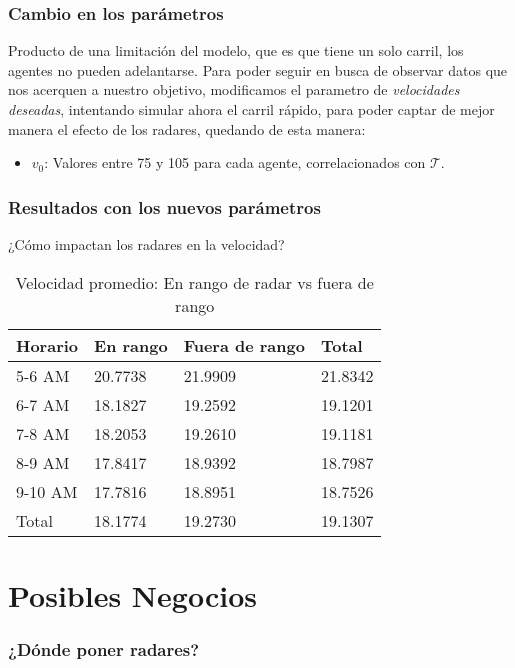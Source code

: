\documentclass[10pt, compress]{beamer}
\begin{document}
\begin{frame}
\frametitle{Cambio en los par\'ametros}

Producto de una limitaci\'on del modelo, que es que tiene un solo carril, los agentes no pueden adelantarse. Para poder seguir en busca de observar datos que nos acerquen a nuestro objetivo, modificamos el parametro de \textit{velocidades deseadas}, intentando simular ahora el carril r\'apido, para poder captar de mejor manera el efecto de los radares, quedando de esta manera:

\begin{itemize}
\item $v_0$: Valores entre 75 y 105 para cada agente, correlacionados con $\mathcal{T}$.
\end{itemize}

\end{frame}

\begin{frame}
\frametitle{Resultados con los nuevos par\'ametros}
\end{frame}

\begin{frame}{¿C\'omo impactan los radares en la velocidad?}
  \begin{table}
    \caption{Velocidad promedio: En rango de radar vs fuera de rango}
    \begin{tabular}{llll}
      \toprule
      Horario & En rango & Fuera de rango & Total \\
      \midrule
      5-6 AM & 20.7738 & 21.9909 & 21.8342\\
      6-7 AM & 18.1827 & 19.2592 & 19.1201\\
      7-8 AM & 18.2053 & 19.2610 & 19.1181\\
      8-9 AM & 17.8417 & 18.9392 & 18.7987\\
      9-10 AM & 17.7816 & 18.8951 & 18.7526\\
      Total & 18.1774 & 19.2730 & 19.1307\\
      \bottomrule
    \end{tabular}
  \end{table}
\end{frame}

\section{Posibles Negocios}

\begin{frame}
\frametitle{¿D\'onde poner radares?}
\end{frame}
\end{document}
